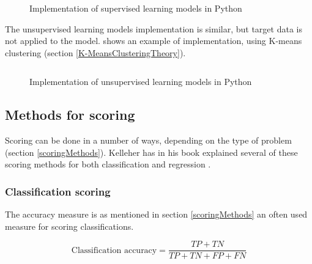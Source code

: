 \documentclass[english, a4paper]{report}
\begin{document}
{{{{                \begin{figure}[H]
                    \centering                    {} \inputminted{python}{thesis/Code/MLmodels.py}
                    \caption{Implementation of supervised learning models in Python }
                    \label{fig:supLearnModels}
                \end{figure}
                
                \par 
                The unsupervised learning models implementation is similar, but target data is not applied to the model.  shows an example of implementation, using K-means clustering (section \ref{K-MeansClusteringTheory}). 
                
                \begin{figure}[H]
                    \centering                    {} \inputminted{python}{thesis/Code/UnsupModels.py}
                    \caption{Implementation of unsupervised learning models in Python }
                    \label{fig:unsupLearnModels}
                \end{figure}
            }
        }
        
        \subsection{Methods for scoring}\label{methods-for-scoring}
        {
            Scoring can be done in a number of ways, depending on the type of problem (section \ref{scoringMethods}). Kelleher has in his book explained several of these scoring methods for both classification and regression \cite{mlKelleher}.
        
            \subsubsection{Classification scoring}
            {
                The accuracy measure is as mentioned in section \ref{scoringMethods} an often used measure for scoring classifications. 
                
                \begin{equation} \label{accuracy}
                    \text{Classification accuracy} = \frac{TP+TN}{TP+TN+FP+FN}
                \end{equation}
                    
}}}}
\end{document}
